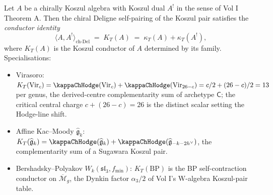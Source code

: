 \begin{proposition}
\label{prop:chiral-deligne-conductor-identity}
Let \(A\) be a chirally Koszul algebra with Koszul dual \(A^{!}\)
in the sense of Vol I Theorem A. Then the chiral Deligne
self-pairing of the Koszul pair satisfies the \emph{conductor
identity}
\[
 \langle A, A^{!}\rangle_{\mathrm{ch\text{-}Del}}
 \;=\;
 K_{T}(A)
 \;=\;
 \kappa_{T}(A) + \kappa_{T}(A^{!}),
\]
where \(K_{T}(A)\) is the Koszul conductor of \(A\) determined by
its family. Specialisations:
\begin{itemize}
\item Virasoro: \(K_{T}(\mathrm{Vir}_{c}) = \kappaChHodge(\mathrm{Vir}_{c})
 + \kappaChHodge(\mathrm{Vir}_{26-c}) = c/2 + (26-c)/2 = 13\) per genus,
 the derived-centre complementarity sum of archetype \(\mathsf C\);
 the critical central charge \(c + (26-c) = 26\) is the distinct scalar
 setting the Hodge-line shift.
\item Affine Kac--Moody \(\widehat{\mathfrak{g}}_{k}\):
 \(K_{T}(\widehat{\mathfrak{g}}_{k}) =
 \kappaChHodge(\widehat{\mathfrak{g}}_{k})
 + \kappaChHodge(\widehat{\mathfrak{g}}_{-k-2h^{\vee}})\),
 the complementarity sum of a Sugawara Koszul pair.
\item Bershadsky--Polyakov \(W_{k}(\mathfrak{sl}_{3}, f_{\min})\):
 \(K_{T}(\mathrm{BP})\) is the BP self-contraction conductor on
 \(\overline{\mathcal{M}}_{g}\), the Dynkin factor \(\alpha_{3}/2\)
 of Vol I's W-algebra Koszul-pair table.
\end{itemize}
\end{proposition}

